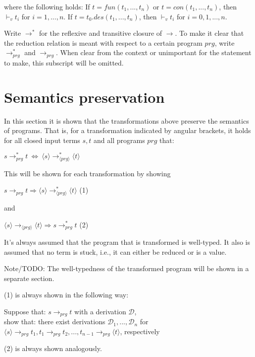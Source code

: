 \documentclass[11pt]{article} %
\begin{document}
where the following holds: If $t = fun(t_1, ..., t_n)$ or $t = con(t_1, ..., t_n)$, then $\vdash_v t_i$ for $i = 1,...,n$. If $t = t_0.des(t_1, ..., t_n)$, then $\vdash_v t_i$ for $i = 0,1,...,n$.

Write $\longrightarrow^*$ for the reflexive and transitive closure of $\longrightarrow$. To make it clear that the reduction relation is meant with respect to a certain program $prg$, write $\longrightarrow^*_{prg}$ and $\longrightarrow_{prg}$. When clear from the context or unimportant for the statement to make, this subscript will be omitted.

\section{Semantics preservation}

In this section it is shown that the transformations above preserve the semantics of programs. That is, for a transformation indicated by angular brackets, it holds for all closed input terms $s, t$ and all programs $prg$ that:

$s \longrightarrow_{prg}^* t ~ \Leftrightarrow ~ \langle s \rangle \longrightarrow_{\langle prg \rangle}^* \langle t \rangle $

This will be shown for each transformation by showing

$s \longrightarrow_{prg} t \Rightarrow \langle s \rangle \longrightarrow_{\langle prg \rangle}^* \langle t \rangle$ (1)

and

$\langle s \rangle \longrightarrow_{\langle prg \rangle} \langle t \rangle \Rightarrow s \longrightarrow_{prg}^* t$ (2)

It's always assumed that the program that is transformed is well-typed. It also is assumed that no term is stuck, i.e., it can either be reduced or is a value.

Note/TODO: The well-typedness of the transformed program will be shown in a separate section.

(1) is always shown in the following way:

Suppose that: $s \longrightarrow_{prg} t$ with a derivation $\mathcal{D}$, \\
show that: there exist derivations $\mathcal{D}_1, ..., \mathcal{D}_n$ for $\langle s \rangle \longrightarrow_{prg} t_1, t_1 \longrightarrow_{prg} t_2, ..., t_{n-1} \longrightarrow_{prg} \langle t \rangle$, respectively

(2) is always shown analogously.
\end{document}
